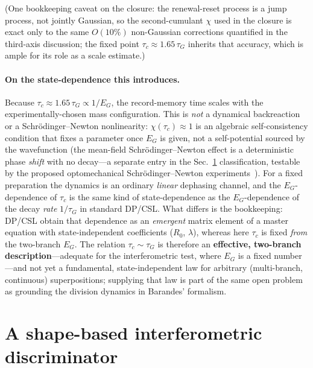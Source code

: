 \documentclass[aps,prd,onecolumn,amsmath,amssymb,nofootinbib,superscriptaddress]{revtex4-2}
\begin{document}
(One bookkeeping caveat on the closure: the renewal-reset process is a jump process, not jointly
Gaussian, so the second-cumulant $\chi$ used in the closure is exact only to the same
$O(10\%)$ non-Gaussian corrections quantified in the third-axis discussion; the fixed point
$\tau_c \approx 1.65\,\tau_G$ inherits that accuracy, which is ample for its role as a scale
estimate.)

\paragraph{On the state-dependence this introduces.} Because $\tau_c\approx1.65\,\tau_G\propto1/E_G$,
the record-memory time scales with the experimentally-chosen mass configuration. This is \emph{not} a
dynamical backreaction or a Schr\"odinger--Newton nonlinearity: $\chi(\tau_c)\approx1$ is an algebraic
self-consistency condition that fixes a parameter once $E_G$ is given, not a self-potential sourced by
the wavefunction (the mean-field Schr\"odinger--Newton effect is a deterministic phase \emph{shift}
with no decay---a separate entry in the Sec.~\ref{sec:disc} classification, testable by the
proposed optomechanical Schr\"odinger--Newton experiments~\cite{R24}). For a fixed preparation the dynamics is an ordinary \emph{linear} dephasing
channel, and the $E_G$-dependence of $\tau_c$ is the same kind of state-dependence as the
$E_G$-dependence of the decay \emph{rate} $1/\tau_G$ in standard DP/CSL. What differs is the
bookkeeping: DP/CSL obtain that dependence as an \emph{emergent} matrix element of a master equation
with state-independent coefficients ($R_0$, $\lambda$), whereas here $\tau_c$ is fixed \emph{from} the
two-branch $E_G$. The relation $\tau_c\sim\tau_G$ is therefore an \textbf{effective, two-branch
description}---adequate for the interferometric test, where $E_G$ is a fixed number---and not yet a
fundamental, state-independent law for arbitrary (multi-branch, continuous) superpositions; supplying
that law is part of the same open problem as grounding the division dynamics in Barandes' formalism.

\section{A shape-based interferometric discriminator}\label{sec:disc}
\end{document}
